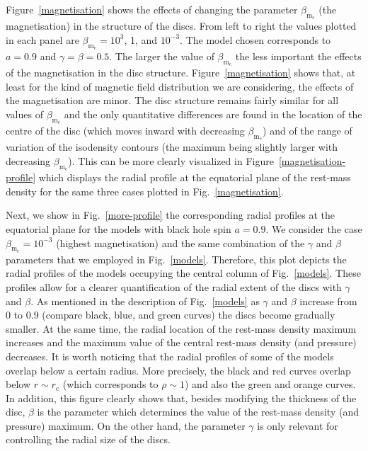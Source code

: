 \documentclass[referee]{aa}
\begin{document}
Figure~\ref{magnetisation} shows the effects of changing the parameter $\beta_{\mathrm{m}_{\mathrm{c}}}$ (the magnetisation) in the structure of the discs. From left to right the values plotted in each panel are $\beta_{\mathrm{m}_{\mathrm{c}}}=10^3$, 1, and $10^{-3}$. The model chosen corresponds to $a=0.9$ and $\gamma=\beta=0.5$. The larger the value of $\beta_{\mathrm{m}_{\mathrm{c}}}$ the less important the effects of the magnetisation in the disc structure. Figure~\ref{magnetisation} shows that, at least for the kind of magnetic field distribution we are considering, the effects of the magnetisation are minor. The disc structure remains fairly similar for all values of $\beta_{\mathrm{m}_{\mathrm{c}}}
$ and the only quantitative differences are found in the location of the centre of the disc (which moves inward with decreasing $\beta_{\mathrm{m}_{\mathrm{c}}}$) and of the range of variation of the isodensity contours (the maximum being slightly larger with decreasing $\beta_{\mathrm{m}_{\mathrm{c}}}$). This can be more clearly visualized in Figure~\ref{magnetisation-profile} which displays the radial profile at the equatorial plane of the rest-mass density for the same three cases plotted in Fig.~\ref{magnetisation}.

Next, we show in Fig.~\ref{more-profile} the corresponding radial profiles at the equatorial plane for the models with black hole spin $a=0.9$. We consider the case $\beta_{\mathrm{m}_{\mathrm{c}}}=10^{-3}$ (highest magnetisation) and the same combination of the $\gamma$ and $\beta$ parameters that we employed in Fig.~\ref{models}. Therefore, this plot depicts the radial profiles of the models occupying the central column of Fig.~\ref{models}. These profiles allow for a clearer quantification of the radial extent of the discs with $\gamma$ and $\beta$. As mentioned in the description of Fig.~\ref{models} as $\gamma$ and $\beta$ increase from 0 to 0.9 (compare black, blue, and green curves) the discs become gradually smaller. At the same time, the radial location of the rest-mass density maximum increases and the maximum value of the central rest-mass density (and pressure) decreases. It is worth noticing that the radial profiles of some of the models overlap below a certain radius. More precisely, the black and red curves overlap below $r\sim r_{\mathrm{c}}$ (which corresponds to $\rho \sim 1$) and also the green and orange curves. In addition, this figure clearly shows that, besides modifying the thickness of the disc, $\beta$ is the parameter which determines the value of the rest-mass density (and pressure) maximum. On the other hand, the parameter $\gamma$ is only relevant for controlling the radial size of the discs.
\end{document}
